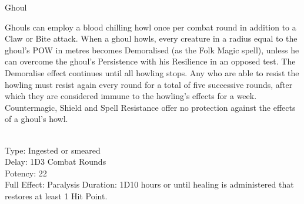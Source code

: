 \begin{monsterbox}{Ghoul}
	\begin{rpg-monsteraction}
		Ghouls can employ a blood chilling howl once per combat round in addition to a Claw or Bite attack. When a ghoul howls, every creature in a radius equal to the ghoul’s POW in metres becomes Demoralised (as the Folk Magic spell), unless he can overcome the ghoul’s Persistence with his Resilience in an opposed test. The Demoralise effect continues until all howling stops. Any who are able to resist the howling must resist again every round for a total of five successive rounds, after which they are considered immune to the howling’s effects for a week. Countermagic, Shield and Spell Resistance offer no protection against the effects of a ghoul’s howl. 
	\end{rpg-monsteraction}
	\begin{rpg-monsteraction}
		\\Type: Ingested or smeared\\
		Delay: 1D3 Combat Rounds\\
                Potency: 22\\
		Full Effect: Paralysis
		Duration: 1D10 hours or until healing is administered that restores at least 1 Hit Point.
	\end{rpg-monsteraction}
\end{monsterbox}
	

